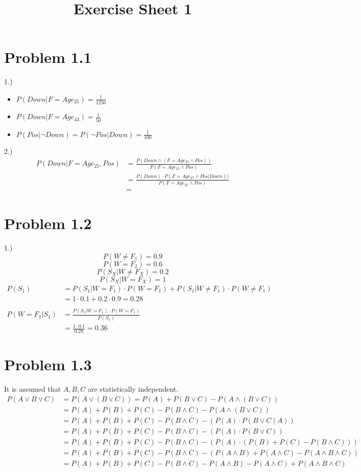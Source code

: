 \documentclass[a4paper]{article}
\title{Exercise Sheet 1}
\begin{document}
\maketitle

\section{Problem 1.1}
1.)
\begin{itemize}
    \item
        $P(Down|F = Age_{25}) = \frac{1}{1250}$
    \item
        $P(Down|F = Age_{43}) = \frac{1}{50}$
    \item
        $P(Pos|\lnot Down) = P(\lnot Pos | Down) = \frac{1}{100}$
\end{itemize}
2.)
\begin{align*}
    P(Down | F = Age_{25}, Pos) &= \frac{P(Down \land (F = Age_{25} \land Pos))}{P( F = Age_{25} \land Pos)}\\
    &= \frac{P(Down) \cdot P(F = Age_{25} \land Pos | Down))}{P( F = Age_{25} \land Pos)}\\
    &= 
\end{align*}

\section{Problem 1.2}
1.)
$$P(W \neq F_1) = 0.9$$
$$P(W = F_2) = 0.6$$
$$P(S_X | W  \neq F_X) = 0.2$$
$$P(S_X | W  = F_X) = 1$$
\begin{align*}
    P(S_1) &= P(S_1 | W=F_1) \cdot P(W = F_1) + P(S_1|W \neq F_1) \cdot P(W \neq F_1)\\
    &= 1 \cdot 0.1 + 0.2 \cdot 0.9 = 0.28\\\\
    P(W = F_1|S_1) &= \frac{P(S_1|W=F_1) \cdot P(W = F_1)}{P(S_1)}\\
    &= \frac{1 \cdot 0.1}{0.28} = 0.36
\end{align*}

\section{Problem 1.3}
It is assumed that $A, B, C$ are statistically independent.
\begin{align*}
    P(A \lor B \lor C) &= P(A \lor (B \lor C)) = P(A) + P(B \lor C) - P(A \land (B \lor C)) \\
    &= P(A) + P(B) + P(C) - P(B \land C) - P(A \land (B \lor C))\\
    &= P(A) + P(B) + P(C) - P(B \land C) - (P(A) \cdot P(B \lor C \;|\; A))\\
    &= P(A) + P(B) + P(C) - P(B \land C) - (P(A) \cdot P(B \lor C))\\
    &= P(A) + P(B) + P(C) - P(B \land C) - (P(A) \cdot (P(B) + P(C) - P(B \land C)))\\
    &= P(A) + P(B) + P(C) - P(B \land C) - (P(A\land B) + P(A \land C) - P(A \land B \land C))\\
    &= P(A) + P(B) + P(C) - P(B \land C) - P(A\land B) - P(A \land C) + P(A \land B \land C)
\end{align*}
\end{document}
